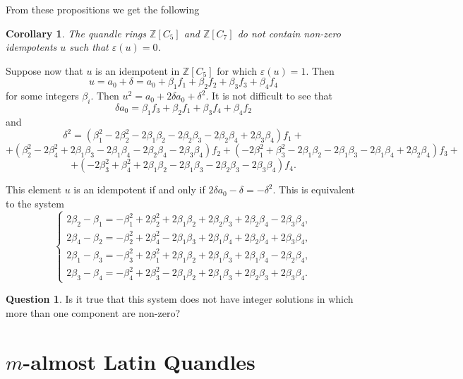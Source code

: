 \documentclass[12pt]{amsart}
\newtheorem{cor}[thm]{Corollary}
\theoremstyle{definition}
\newtheorem{qst}[thm]{Question}
\theoremstyle{remark}
\newcommand{\Z}{\mathbb{Z}}
\def\b{\beta}
\begin{document}
From these propositions we get the following

\begin{cor}
The quandle rings  $\Z[C_5]$ and $\Z[C_7]$   do not contain non-zero idempotents $u$ such that $\varepsilon(u) =0$.
\end{cor}




Suppose now that $u$ is an idempotent in  $\Z[C_5]$ for which $\varepsilon(u) =1$. Then 
$$
u = a_0 + \delta = a_0 + \b_1 f_1 + \b_2 f_2 + \b_3 f_3 + \b_4 f_4
$$
for some integers $\b_i$. Then $u^2 = a_0 + 2 \delta a_0 + \delta^2$. It is not difficult to see that
$$
\delta a_0 =  \b_1 f_3 + \b_2 f_1 + \b_3 f_4 + \b_4 f_2
$$
and
$$
\delta^2 = (\b_1^2 - 2 \b_2^2 - 2 \b_1 \b_2 - 2 \b_2 \b_3 - 2 \b_2 \b_4 + 2 \b_3 \b_4) f_1 + 
$$
$$
+ (\b_2^2 - 2 \b_4^2 + 2 \b_1 \b_3 - 2 \b_1 \b_4 - 2 \b_2 \b_4 - 2 \b_3 \b_4) f_2 
+ (- 2 \b_1^2 + \b_3^2 - 2 \b_1 \b_2 - 2 \b_1 \b_3 - 2 \b_1 \b_4 + 2 \b_2 \b_4) f_3 +
$$
$$
+ (- 2 \b_3^2 + \b_4^2 + 2 \b_1 \b_2 - 2 \b_1 \b_3 - 2 \b_2 \b_3 - 2 \b_3 \b_4) f_4.
$$



This element $u$ is an idempotent if and only if $2 \delta a_0 - \delta = -\delta^2$. This is equivalent to the system
$$
\begin{cases}
2 \b_2 - \b_1 = -\b_1^2 + 2 \b_2^2 + 2 \b_1 \b_2 + 2 \b_2 \b_3 + 2 \b_2 \b_4 - 2 \b_3 \b_4,    \\ 
2 \b_4 - \b_2 = -\b_2^2 + 2 \b_4^2 - 2 \b_1 \b_3 + 2 \b_1 \b_4 + 2 \b_2 \b_4 + 2 \b_3 \b_4,    \\ 
2 \b_1 - \b_3 = -\b_3^2 + 2 \b_1^2 + 2 \b_1 \b_2 + 2 \b_1 \b_3 + 2 \b_1 \b_4 - 2 \b_2 \b_4,    \\ 
2 \b_3 - \b_4 = -\b_4^2 + 2 \b_3^2 - 2 \b_1 \b_2 + 2 \b_1 \b_3 + 2 \b_2 \b_3 + 2 \b_3 \b_4.
\end{cases}
$$

\begin{qst}
Is it true that this system does not have  integer  solutions in which more than one component are non-zero? 
\end{qst}



 
\section{$m$-almost Latin Quandles}\label{2-almost}
\end{document}
